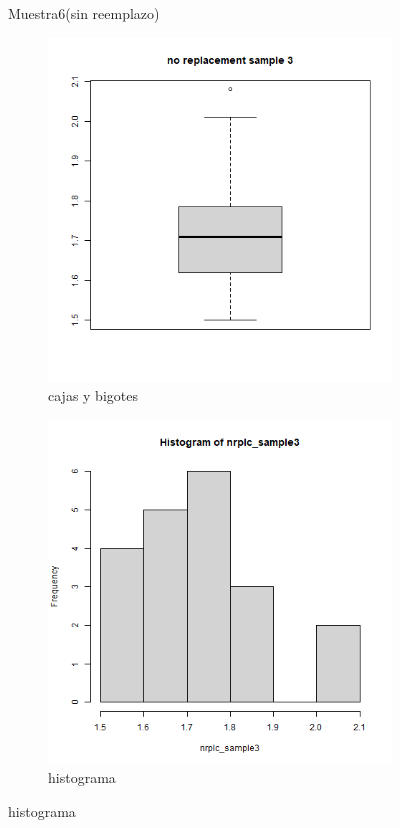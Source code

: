 \documentclass[a4paper,12pt]{article}
\begin{document}
\begin{enumerate}
\begin{figure}[t!]
    
    \caption{Muestra6(sin reemplazo)}
    \label{figure}
\end{figure}

\begin{figure}[t!]
    \centering
    \begin{subfigure}[b]{0.4\linewidth}             
        \includegraphics[width = \linewidth]{./datos generados (Ejercicio 1)/no_replacement_sample3_boxplot.png}
        \caption{cajas y bigotes}
    \end{subfigure}
    \begin{subfigure}[b]{0.4\linewidth}               
        \includegraphics[width = \linewidth]{./datos generados (Ejercicio 1)/no_replacement_sample3_hist.png}
        \caption{histograma}
    \end{subfigure}


\end{figure}
\end{enumerate}
\end{document}
